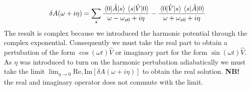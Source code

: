 \begin{solution}
\begin{equation}
    \delta A(\omega + i\eta) = \sum_{s} \dfrac{\mel{0}{\hat{A}}{s}\mel{s}{\hat{V}}{0}}{\omega - \omega_{s0} + i\eta} - \dfrac{\mel{0}{\hat{V}}{s}\mel{s}{\hat{A}}{0}}{\omega + \omega_{s0} + i\eta} 
    \label{eq:Kubo}
\end{equation}
The result is complex because we introduced the harmonic potential through the complex exponential. Consequently we must take the real part to obtain a pertubation of the form $\cos(\omega t)\hat{V}$ or imaginary part for the form $\sin(\omega t)\hat{V}$. As $\eta$ was introduced to turn on the harmonic pertubation adiabatically we must take the limit $\lim_{\eta\rightarrow0}\mathrm{Re,Im}[\delta A(\omega+i\eta)]$ to obtain the real solution. \textbf{NB!} the real and imaginary operator does not commute with the limit.
\end{solution}


